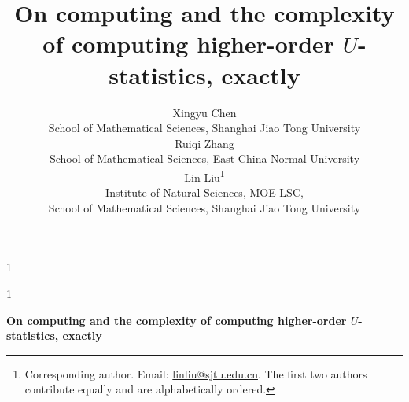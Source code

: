 \documentclass[sn-mathphys, natbib=false]{sn-jnl}
\newcommand{\anon}{1}
\theoremstyle{plain}
\theoremstyle{definition}
\begin{document}
\def\spacingset#1{\renewcommand{\baselinestretch}%
{#1}\small\normalsize} \spacingset{1}



\anon
{
  \title{\bf On computing and the complexity of computing higher-order $U$-statistics, exactly}
 \author{
    \centering
    Xingyu Chen \\
    School of Mathematical Sciences, Shanghai Jiao Tong University \\
    Ruiqi Zhang \\
    School of Mathematical Sciences, East China Normal University \\
    Lin Liu\footnote{Corresponding author. Email: \url{linliu@sjtu.edu.cn}. The first two authors contribute equally and are alphabetically ordered.} \\
    Institute of Natural Sciences, MOE-LSC, \\ 
    School of Mathematical Sciences, Shanghai Jiao Tong University
    }
  \maketitle
  \thispagestyle{empty}
} \fi

\anon
{
  \bigskip
  \bigskip
  \bigskip
  \begin{center}
    {\LARGE\bf On computing and the complexity of computing higher-order $U$-statistics, exactly}
\end{center}
  \medskip
} \fi
\end{document}
